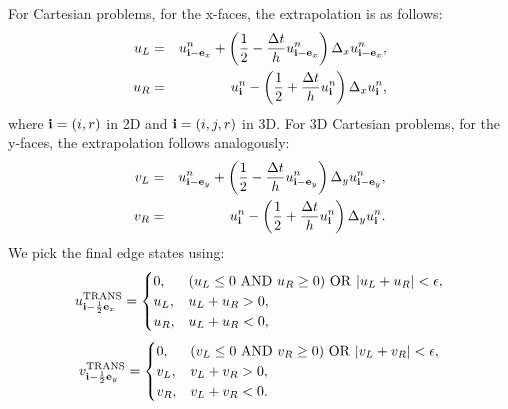 \documentclass[11pt]{article}
\def\half  {\frac{1}{2}}
\def\dt    {\Delta t}
\def\trans {\rm TRANS}
\def\eb    {{\bf e}}
\def\ib    {{\bf i}}
\begin{document}
For Cartesian problems, for the x-faces, the extrapolation is as follows:
\begin{eqnarray}
u_L &=& u_{\ib-\eb_x}^n + \left(\half - \frac{\dt}{h}u_{\ib-\eb_x}^n\right)\Delta_x u_{\ib-\eb_x}^n, \\
u_R &=& u_{\ib}^n - \left(\half + \frac{\dt}{h}u_{\ib}^n\right)\Delta_x u_{\ib}^n,
\end{eqnarray}
where $\ib = (i,r)$ in 2D and $\ib = (i,j,r)$ in 3D.  For 3D Cartesian problems, for the y-faces, the extrapolation follows analogously:
\begin{eqnarray}
v_L &=& u_{\ib-\eb_y}^n + \left(\half - \frac{\dt}{h}u_{\ib-\eb_y}^n\right)\Delta_y u_{\ib-\eb_y}^n, \\
v_R &=& u_{\ib}^n - \left(\half + \frac{\dt}{h}u_{\ib}^n\right)\Delta_y u_{\ib}^n.
\end{eqnarray}
We pick the final edge states using:
\begin{equation}
u^{\trans}_{\ib-\half\eb_x} =
\begin{cases}
0, & (u_L \le 0 ~ {\rm AND} ~ u_R \ge 0) ~ {\rm OR} ~ |u_L + u_R| < \epsilon, \\
u_L, & u_L + u_R > 0, \\
u_R, & u_L + u_R < 0, \\
\end{cases}
\end{equation}
\begin{equation}
v^{\trans}_{\ib-\half\eb_y} =
\begin{cases}
0, & (v_L \le 0 ~ {\rm AND} ~ v_R \ge 0) ~ {\rm OR} ~ |v_L + v_R| < \epsilon, \\
v_L, & v_L + v_R > 0, \\
v_R, & v_L + v_R < 0. \\
\end{cases}
\end{equation}
\end{document}
